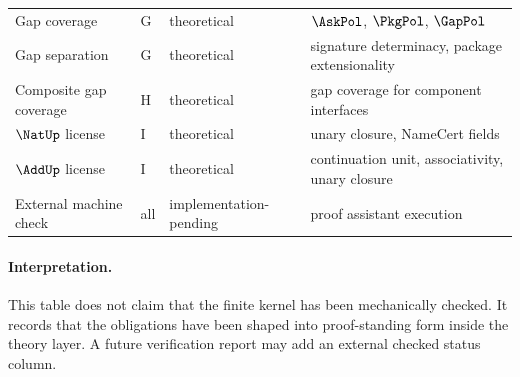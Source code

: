 \begin{longtable}{p{}p{}p{}p{}}
Gap coverage & G & theoretical & \(\AskPol\), \(\PkgPol\), \(\GapPol\)\\
Gap separation & G & theoretical & signature determinacy, package extensionality\\
Composite gap coverage & H & theoretical & gap coverage for component interfaces\\
\(\NatUp\) license & I & theoretical & unary closure, NameCert fields\\
\(\AddUp\) license & I & theoretical & continuation unit, associativity, unary closure\\
External machine check & all & implementation-pending & proof assistant execution\\
\bottomrule
\end{longtable}

\paragraph{Interpretation.}
This table does not claim that the finite kernel has been mechanically checked. It records that the obligations have been shaped into proof-standing form inside the theory layer. A future verification report may add an external checked status column.
